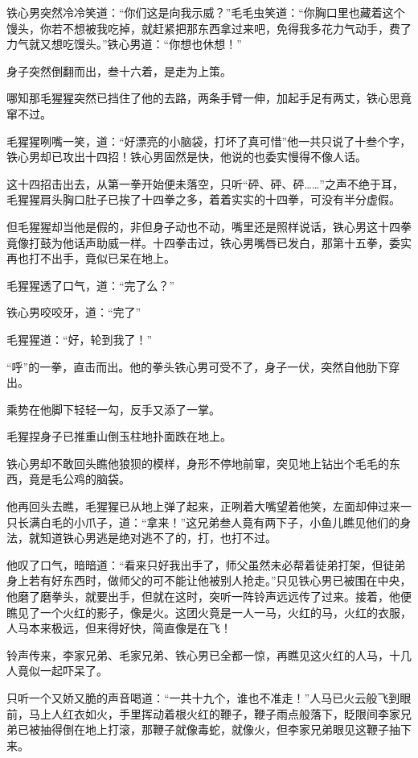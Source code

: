 \documentclass[12pt,oneside]{book}
\begin{document}
铁心男突然冷冷笑道：``你们这是向我示威？''毛毛虫笑道：``你胸口里也藏着这个馒头，你若不想被我吃掉，就赶紧把那东西拿过来吧，免得我多花力气动手，费了力气就又想吃馒头。''铁心男道：``你想也休想！''

身子突然倒翻而出，叁十六着，是走为上策。

哪知那毛猩猩突然已挡住了他的去路，两条手臂一伸，加起手足有两丈，铁心思竟窜不过。

毛猩猩咧嘴一笑，道：``好漂亮的小脑袋，打坏了真可惜''他一共只说了十叁个字，铁心男却已攻出十四招！铁心男固然是快，他说的也委实慢得不像人话。

这十四招击出去，从第一拳开始便未落空，只听``砰、砰、砰\ldots\ldots{}''之声不绝于耳，毛猩猩肩头胸口肚子已挨了十四拳之多，着着实实的十四拳，可没有半分虚假。

但毛猩猩却当他是假的，非但身子动也不动，嘴里还是照样说话，铁心男这十四拳竟像打鼓为他话声助威一样。十四拳击过，铁心男嘴唇已发白，那第十五拳，委实再也打不出手，竟似已呆在地上。

毛猩猩透了口气，道：``完了么？''

铁心男咬咬牙，道：``完了''

毛猩猩道：``好，轮到我了！''

``呼''的一拳，直击而出。他的拳头铁心男可受不了，身子一伏，突然自他肋下穿出。

乘势在他脚下轻轻一勾，反手又添了一掌。

毛猩捏身子已推重山倒玉柱地扑面跌在地上。

铁心男却不敢回头瞧他狼狈的模样，身形不停地前窜，突见地上钻出个毛毛的东西，竟是毛公鸡的脑袋。

他再回头去瞧，毛猩猩已从地上弹了起来，正咧着大嘴望着他笑，左面却伸过来一只长满白毛的小爪子，道：``拿来！''这兄弟叁人竟有两下子，小鱼儿瞧见他们的身法，就知道铁心男逃是绝对逃不了的，打，也打不过。

他叹了口气，暗暗道：``看来只好我出手了，师父虽然未必帮着徒弟打架，但徒弟身上若有好东西时，做师父的可不能让他被别人抢走。''只见铁心男已被围在中央，他磨了磨拳头，就要出手，但就在这时，突听一阵铃声远远传了过来。接着，他便瞧见了一个火红的影子，像是火。这团火竟是一人一马，火红的马，火红的衣服，人马本来极远，但来得好快，简直像是在飞！

铃声传来，李家兄弟、毛家兄弟、铁心男已全都一惊，再瞧见这火红的人马，十几人竟似一起吓呆了。

只听一个又娇又脆的声音喝道：``一共十九个，谁也不准走！''人马已火云般飞到眼前，马上人红衣如火，手里挥动着根火红的鞭子，鞭子雨点般落下，眨限间李家兄弟已被抽得倒在地上打滚，那鞭子就像毒蛇，就像火，但李家兄弟眼见这鞭子抽下来。
\end{document}
